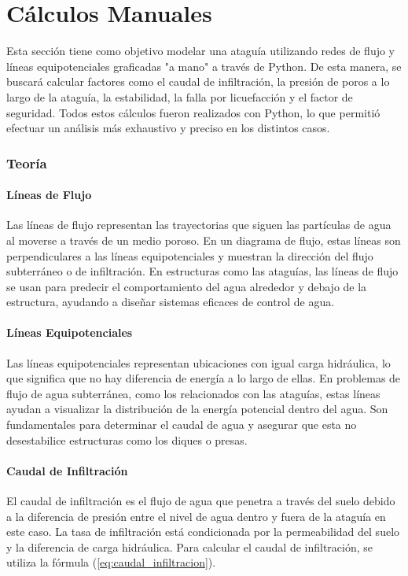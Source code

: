 \part{Cálculos Manuales}

Esta sección tiene como objetivo modelar una ataguía utilizando redes de flujo y líneas equipotenciales graficadas "a mano" a través de Python. De esta manera, se buscará calcular factores como el caudal de infiltración, la presión de poros a lo largo de la ataguía, la estabilidad, la falla por licuefacción y el factor de seguridad. Todos estos cálculos fueron realizados con Python, lo que permitió efectuar un análisis más exhaustivo y preciso en los distintos casos.

\section{Teoría}
\subsection{Líneas de Flujo}
Las líneas de flujo representan las trayectorias que siguen las partículas de agua al moverse a través de un medio poroso. En un diagrama de flujo, estas líneas son perpendiculares a las líneas equipotenciales y muestran la dirección del flujo subterráneo o de infiltración. En estructuras como las ataguías, las líneas de flujo se usan para predecir el comportamiento del agua alrededor y debajo de la estructura, ayudando a diseñar sistemas eficaces de control de agua. \textbf{\cite{structville}}

\subsection{Líneas Equipotenciales}
Las líneas equipotenciales representan ubicaciones con igual carga hidráulica, lo que significa que no hay diferencia de energía a lo largo de ellas. En problemas de flujo de agua subterránea, como los relacionados con las ataguías, estas líneas ayudan a visualizar la distribución de la energía potencial dentro del agua. Son fundamentales para determinar el caudal de agua y asegurar que esta no desestabilice estructuras como los diques o presas. \textbf{\cite{structville}}

\subsection{Caudal de Infiltración}
El caudal de infiltración es el flujo de agua que penetra a través del suelo debido a la diferencia de presión entre el nivel de agua dentro y fuera de la ataguía en este caso. La tasa de infiltración está condicionada por la permeabilidad del suelo y la diferencia de carga hidráulica. Para calcular el caudal de infiltración, se utiliza la fórmula (\ref{eq:caudal_infiltracion}). \textbf{\cite{stability_cofferdam_2024}}

